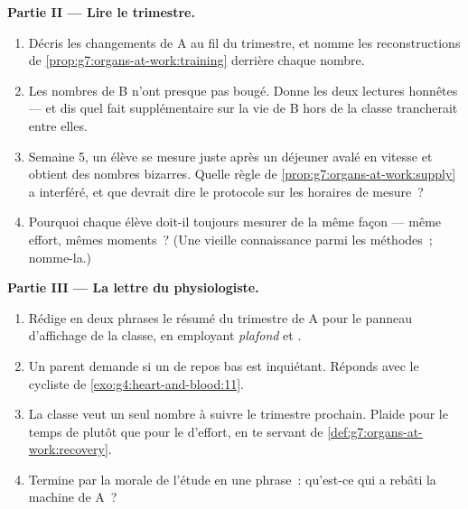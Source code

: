 \begin{problem}
\medskip\noindent\textbf{Partie II --- Lire le trimestre.}
\begin{enumerate}[resume]
  \item Décris les changements de A au fil du trimestre, et nomme
        les reconstructions de
        \cref{prop:g7:organs-at-work:training} derrière chaque
        nombre.
  \item Les nombres de B n'ont presque pas bougé. Donne les deux
        lectures honnêtes --- et dis quel fait supplémentaire sur
        la vie de B hors de la classe trancherait entre elles.
  \item Semaine 5, un élève se mesure juste après un déjeuner
        avalé en vitesse et obtient des nombres bizarres. Quelle
        règle de \cref{prop:g7:organs-at-work:supply} a interféré,
        et que devrait dire le protocole sur les horaires de
        mesure~?
  \item Pourquoi chaque élève doit-il toujours mesurer de la même
        façon --- même effort, mêmes moments~? (Une vieille
        connaissance parmi les méthodes~; nomme-la.)
\end{enumerate}

\medskip\noindent\textbf{Partie III --- La lettre du
physiologiste.}
\begin{enumerate}[resume]
  \item Rédige en deux phrases le résumé du trimestre de A pour le
        panneau d'affichage de la classe, en employant
        \emph{plafond} et \emph{}.
  \item Un parent demande si un  de repos bas est inquiétant.
        Réponds avec le cycliste de
        \cref{exo:g4:heart-and-blood:11}.
  \item La classe veut un seul nombre à suivre le trimestre
        prochain. Plaide pour le temps de  plutôt que
        pour le  d'effort, en te servant de
        \cref{def:g7:organs-at-work:recovery}.
  \item Termine par la morale de l'étude en une phrase~: qu'est-ce
        qui a rebâti la machine de A~?
\end{enumerate}
\end{problem}
